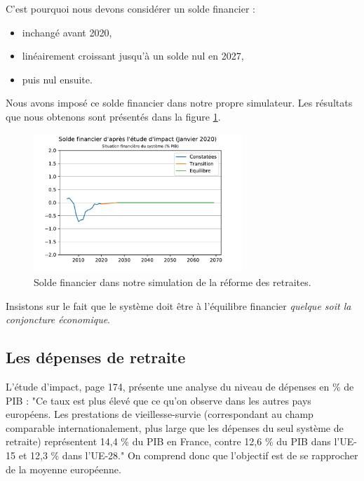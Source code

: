 \documentclass[10pt]{article}
\begin{document}
C'est pourquoi nous devons considérer un solde financier :
\begin{itemize}
\item inchangé avant 2020,
\item linéairement croissant jusqu'à un solde nul en 2027,
\item puis nul ensuite.
\end{itemize}

Nous avons imposé ce solde financier dans notre propre simulateur. 
Les résultats que nous obtenons sont présentés dans la figure \ref{fig-solde-simulation}. 

\begin{figure}
\begin{center}
\includegraphics[width=0.7\textwidth]{Simulation-Solde-Financier.pdf}
\end{center}
\caption{Solde financier dans notre simulation de la réforme des retraites.}
\label{fig-solde-simulation}
\end{figure}

Insistons sur le fait que le système doit être à 
l'équilibre financier \emph{quelque soit la 
conjoncture économique}. 


\subsection{Les dépenses de retraite}

L'étude d'impact, page 174, présente une analyse du niveau de dépenses 
en \% de PIB : "Ce taux est plus élevé que ce qu’on observe dans 
les autres pays européens. Les prestations de vieillesse-survie 
(correspondant au champ comparable internationalement, plus 
large que les dépenses du seul système de retraite) représentent 
14,4 \% du PIB en France, contre 12,6 \% du PIB dans l’UE-15 et 12,3 \% dans l’UE-28."
On comprend donc que l'objectif est de se rapprocher de la moyenne européenne. 
\end{document}
